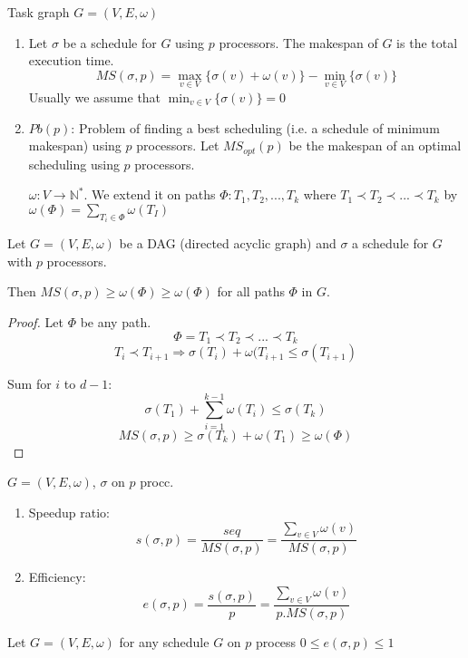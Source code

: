\begin{defi}[Makespan]
Task graph $G=(V,E,\omega )$
\begin{enumerate}
\item Let $\sigma$ be a schedule for $G$ using $p$ processors. The makespan of $G$ is the total execution time.
\[MS(\sigma, p) = \max_{v\in V} \{\sigma (v) + \omega (v) \} - \min_{v\in V}\{\sigma ( v)\}\]
Usually we assume that $\min_{v\in V}\{\sigma ( v)\}=0$

\item $Pb(p)$: Problem of finding a best scheduling (i.e. a schedule of minimum makespan) using $p$ processors. Let $MS_{opt}(p)$ be the makespan of an optimal scheduling using $p$ processors.

$\omega : V \to \mathbb{N}^*$. We extend it on paths $\Phi : T_1,T_2,...,T_k$ where $T_1 \prec T_2 \prec ... \prec T_k$ by $\omega ( \Phi) =\sum_{T_i \in \Phi} \omega (T_I)$
\end{enumerate}
\end{defi}

\begin{prop}
Let $G=(V,E,\omega)$ be a DAG (directed acyclic graph) and $\sigma$ a schedule for $G$ with $p$ processors.

Then $MS(\sigma, p)\geq \omega (\Phi) \geq \omega (\Phi)$ for all paths $\Phi$ in $G$.
\end{prop}

\begin{proof}
Let $\Phi$ be any path. 
\[\Phi=T_1 \prec T_2 \prec ... \prec T_k\]
\[T_i \prec T_{i+1} \Rightarrow \sigma (T_i) + \omega ( T_{i+1} \leq \sigma (T_{i+1})\]

Sum for $i$ to $d-1$:
\[\sigma (T_1) + \sum_{i=1}^{k-1} \omega(T_i) \leq \sigma(T_k) \]
\[MS(\sigma, p) \geq \sigma (T_k) + \omega (T_1) \geq \omega (\Phi)\]
\end{proof}


\begin{defi}
$G=(V,E,\omega)$, $\sigma$ on $p$ procc.
\begin{enumerate}
\item Speedup ratio:
\[s(\sigma, p)=\frac{seq}{MS(\sigma,p)} = \frac{\sum_{v\in V} \omega (v)}{MS(\sigma,p)}\]
\item Efficiency:
\[e(\sigma, p)=\frac{s(\sigma, p)}{p} = \frac{\sum_{v\in V} \omega (v)}{p.MS(\sigma,p)}\]
\end{enumerate}
\end{defi}


\begin{thm}
Let $G=(V,E,\omega)$ for any schedule $G$ on $p$ process $0\leq e(\sigma, p) \leq 1$
\end{thm}

